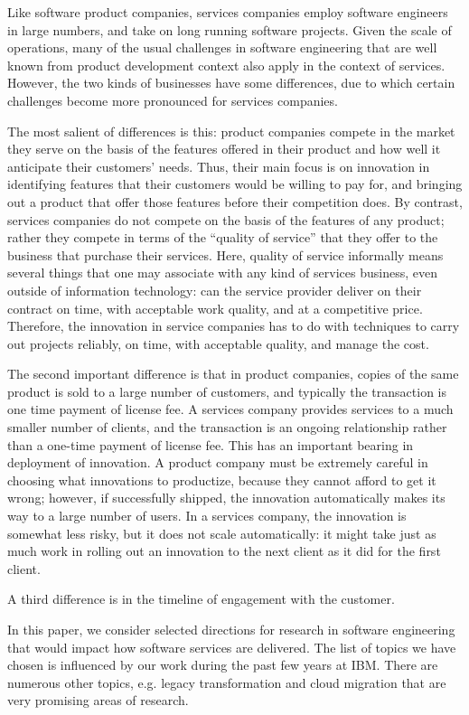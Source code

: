 Like software product companies, services companies employ software engineers in large numbers, and take on long running software projects. Given the scale of operations, many of the usual challenges in software engineering that are well known from product development context also apply in the context of services.  However, the two kinds of businesses have some differences, due to which certain challenges become more pronounced for services companies. 

The most salient of differences is this: product companies compete in the market they serve on the basis of the features offered in their product and how well it anticipate their customers' needs. Thus, their main focus is on innovation in identifying features that their customers would be willing to pay for, and bringing out a product that offer those features before their competition does. By contrast, services companies do not compete on the basis of the features of any product; rather they compete in terms of the ``quality of service'' that they offer to the business that purchase their services. Here, quality of service informally means several things that one may associate with any kind of services business, even outside of information technology: can the service provider deliver on their contract on time, with acceptable work quality, and at a competitive price.  Therefore, the innovation in service companies has to do with techniques to carry out projects reliably, on time, with acceptable quality, and manage the cost.

The second important difference is that in product companies, copies of the same product is sold to a large number of customers, and typically the transaction is one time payment of license fee.  A services company provides services to a much smaller number of clients, and the transaction is an ongoing relationship rather than a one-time payment of license fee. This has an important bearing in deployment of innovation.  A product company must be extremely careful in choosing what innovations to productize, because they cannot afford to get it wrong; however, if successfully shipped, the innovation automatically makes its way to a large number of users.  In a services company, the innovation is somewhat less risky, but it does not scale automatically: it might take just as much work in rolling out an innovation to the next client as it did for the first client.

A third difference is in the timeline of engagement with the customer.


In this paper, we consider selected directions for research in software engineering that would impact how software services are delivered.  The list of topics we have chosen is influenced by our work during the past few years at IBM.  There are numerous other topics, e.g. legacy transformation and cloud migration that are very promising areas of research.

\label{sec:intro}
